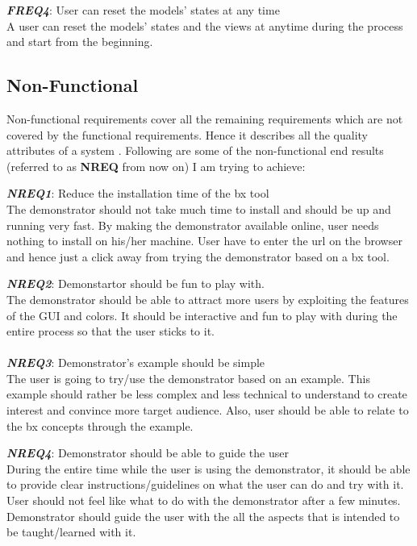 \textbf{\textit{FREQ4}}: User can reset the models' states at any time\\
A user can reset the models' states and the views at anytime during the process and start from the beginning.

\subsection{Non-Functional}\label{subsec:nonfunctionalreq}
Non-functional requirements cover all the remaining requirements which are not covered by the functional requirements. Hence it describes all the quality attributes of a system \cite{funcandnonfuncreq}.
\newline\newline Following are some of the non-functional end results (referred to as \textbf{NREQ} from now on) I am trying to achieve:

\textbf{\textit{NREQ1}}: Reduce the installation time of the bx tool\\
The demonstrator should not take much time to install and should be up and running very fast. By making the demonstrator available online, user needs nothing to install on his/her machine. User have to enter the url on the browser and hence just a click away from trying the demonstrator based on a bx tool.

\textbf{\textit{NREQ2}}: Demonstartor should be fun to play with.\\
The demonstrator should be able to attract more users by exploiting the features of the GUI and colors. It should be interactive and fun to play with during the entire process so that the user sticks to it.\\\\
\textbf{\textit{NREQ3}}: Demonstrator's example should be simple\\
The user is going to try/use the demonstrator based on an example. This example should rather be less complex and less technical to understand to create interest and convince more target audience. Also, user should be able to relate to the bx concepts through the example.

\textbf{\textit{NREQ4}}: Demonstrator should be able to guide the user\\
During the entire time while the user is using the demonstrator, it should be able to provide clear instructions/guidelines on what the user can do and try with it. User should not feel like what to do with the demonstrator after a few minutes. Demonstrator should guide the user with the all the aspects that is intended to be taught/learned with it.

